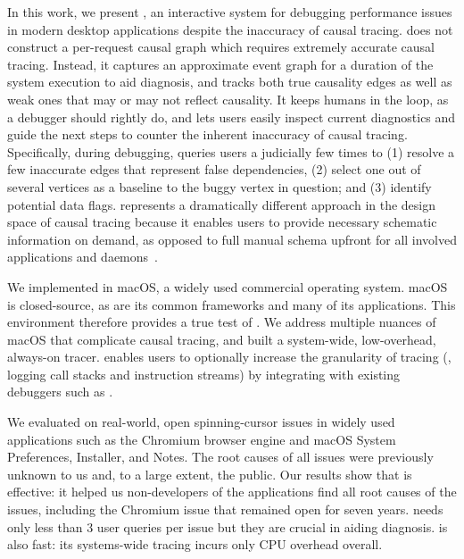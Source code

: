 In this work, we present \xxx, an interactive system for debugging performance
issues in modern desktop applications despite the inaccuracy of causal tracing.
\xxx does not construct a per-request causal graph which requires extremely
accurate causal tracing. Instead, it captures an approximate event graph for
a duration of the system execution to aid diagnosis, and tracks both true
causality edges as well as weak ones that may or may not reflect causality.
It keeps humans in the loop, as a debugger should rightly do, and lets users
easily inspect current diagnostics and guide the next steps to counter the
inherent inaccuracy of causal tracing. Specifically, during debugging, \xxx
queries users a judicially few times to (1) resolve a few inaccurate edges
that represent false dependencies, (2) select one out of several vertices as a
baseline to the buggy vertex in question; and (3) identify potential data flags.
\xxx represents a dramatically different approach in the design space of causal
tracing because it enables users to provide necessary schematic information on
demand, as opposed to full manual schema upfront for all involved applications
and daemons~\cite{barham2004using}.

We implemented \xxx in macOS, a widely used commercial operating system. macOS
is closed-source, as are its common frameworks and many of its applications.
This environment therefore provides a true test of \xxx. We address multiple
nuances of macOS that complicate causal tracing, and built a system-wide,
low-overhead, always-on tracer. \xxx enables users to optionally increase the
granularity of tracing (\eg, logging call stacks and instruction streams) by
integrating with existing debuggers such as .

We evaluated \xxx on \nbug real-world, open spinning-cursor issues in widely
used applications such as the Chromium browser engine and macOS System
Preferences, Installer, and Notes. The root causes of all \nbug issues were
previously unknown to us and, to a large extent, the public. Our results show
that \xxx is effective: it helped us non-developers of the applications find all
root causes of the issues, including the Chromium issue that remained open for
seven years. \xxx needs only less than 3 user queries per issue but they are
crucial in aiding diagnosis. \xxx is also fast: its systems-wide tracing incurs
only \cpuoverhead CPU overhead overall.


